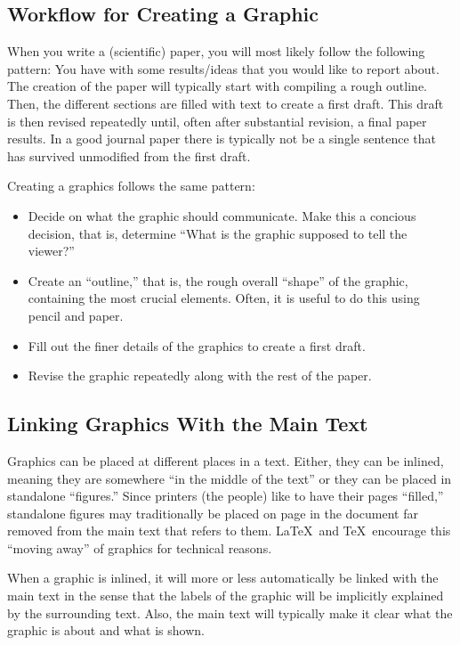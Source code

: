 \subsection{Workflow for Creating a Graphic}

When you write a (scientific) paper, you will most likely follow the
following pattern: You have with some results/ideas that you would
like to report about. The creation of the paper will typically start
with compiling a rough outline. Then, the different sections are
filled with text to create a first draft. This draft is then revised
repeatedly until, often after substantial revision, a final paper
results. In a good journal paper there is typically not be a single 
sentence that has survived unmodified from the first draft.

Creating a graphics follows the same pattern:
\begin{itemize}
\item
  Decide on what the graphic should communicate. Make this a concious
  decision, that is, determine ``What is the graphic supposed to tell
  the viewer?''
\item
  Create an ``outline,'' that is, the rough overall ``shape'' of the
  graphic, containing the most crucial elements. Often, it is
  useful to do this using pencil and paper.
\item
  Fill out the finer details of the graphics to create a first
  draft.
\item
  Revise the graphic repeatedly along with the rest of the paper.
\end{itemize}




\subsection{Linking Graphics With the Main Text}

Graphics can be placed at different places in a text. Either, they can
be inlined, meaning they are somewhere ``in the middle of the text''
or they can be placed in standalone ``figures.'' Since printers (the
people) like to have their pages ``filled,'' standalone figures may
traditionally be placed on page in the document far removed from the
main text that refers to them. \LaTeX\ and \TeX\ encourage this
``moving away'' of graphics for technical reasons.

When a graphic is inlined, it will more or less automatically be
linked with the main text in the sense that the labels of the graphic
will be implicitly explained by the surrounding text. Also, the main
text will typically make it clear what the graphic is about and what
is shown.

